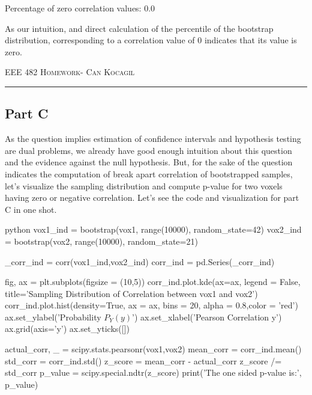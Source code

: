 \documentclass[12pt]{amsart}
\begin{document}
Percentage of zero correlation values: 0.0

\bigskip

As our intuition, and direct calculation of the percentile of the bootstrap distribution, corresponding to a correlation value of 0 indicates that its value is zero.


\newpage
{\scshape EEE 482} \hfill {\scshape \large  Homework-\relax} \hfill {\scshape Can Kocagil}
\smallskip
\hrule
\vspace{2mm}

\subsection{Part C}
As the question implies estimation of confidence intervals and hypothesis testing are dual problems, we already have good enough intuition about this question and the evidence against the null hypothesis. But, for the sake of the question indicates the computation of break apart correlation of bootstrapped samples, let's visualize the sampling distribution and compute p-value for two voxels having zero or negative correlation. Let's see the code and visualization for part C in one shot.


\begin{mintedbox}{python}
vox1_ind = bootstrap(vox1, range(10000), random_state=42)
vox2_ind = bootstrap(vox2, range(10000), random_state=21)

_corr_ind = corr(vox1_ind,vox2_ind)
corr_ind = pd.Series(_corr_ind)

fig, ax = plt.subplots(figsize = (10,5))
corr_ind.plot.kde(ax=ax, legend = False, title='Sampling Distribution of Correlation between vox1 and vox2')
corr_ind.plot.hist(density=True, ax = ax, bins = 20, alpha = 0.8,color = 'red')
ax.set_ylabel('Probability $P_Y(y)$')
ax.set_xlabel('Pearson Correlation y')
ax.grid(axis='y')
ax.set_yticks([])

actual_corr, _ = scipy.stats.pearsonr(vox1,vox2)
mean_corr = corr_ind.mean()
std_corr = corr_ind.std()
z_score = mean_corr - actual_corr
z_score /= std_corr
p_value = scipy.special.ndtr(z_score)
print('The one sided p-value is:', p_value)
\end{mintedbox}
\end{document}
